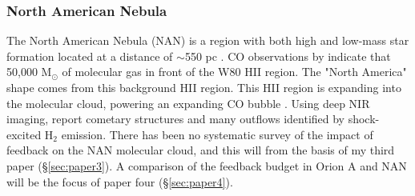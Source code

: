 \subsubsection{North American Nebula}\label{sec:nan}
The North American Nebula (NAN) is a region with both high and low-mass star formation located at a distance of $\sim$550 pc \cite{Laugalys06}. CO observations by \citet{Zhang14} indicate that 50,000 M$_\odot$ of molecular gas in front of the W80 HII region. The "North America" shape comes from this background HII region. This HII region is expanding into the molecular cloud, powering an expanding CO bubble \cite{Bally80}. Using deep NIR imaging, \citet{Bally14} report cometary structures and many outflows identified by shock-excited H$_2$ emission. There has been no systematic survey of the impact of feedback on the NAN molecular cloud, and this will from the basis of my third paper (\S\ref{sec:paper3}). A comparison of the feedback budget in Orion A and NAN will be the focus of paper four (\S\ref{sec:paper4}). 
  
